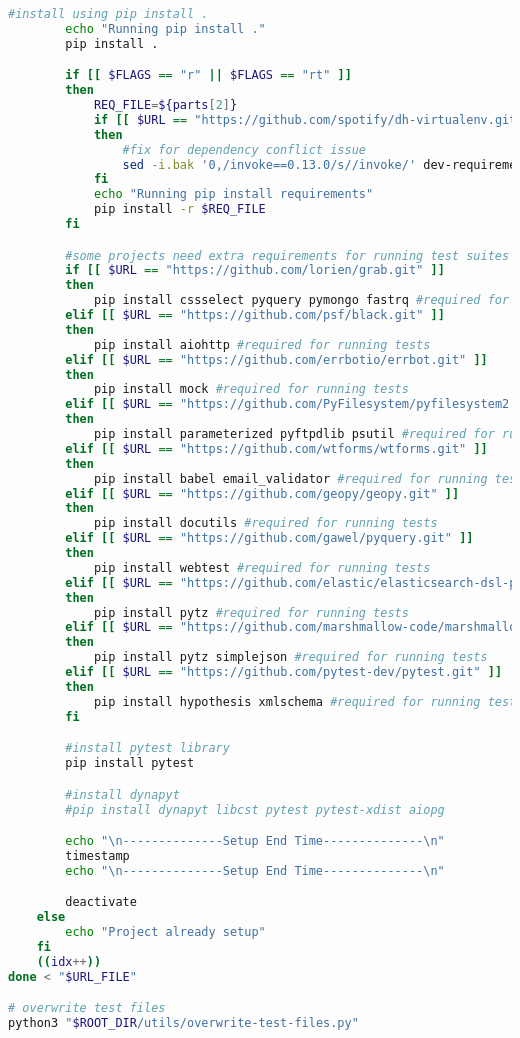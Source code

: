 \begin{lstlisting}[caption=install-missing-projects.sh,label=code:install-missing-projects.sh,language=Bash]
        #install using pip install . 
        echo "Running pip install ."
        pip install .

        if [[ $FLAGS == "r" || $FLAGS == "rt" ]]
        then
            REQ_FILE=${parts[2]}
            if [[ $URL == "https://github.com/spotify/dh-virtualenv.git" ]]
            then
                #fix for dependency conflict issue
                sed -i.bak '0,/invoke==0.13.0/s//invoke/' dev-requirements.txt
            fi
            echo "Running pip install requirements"
            pip install -r $REQ_FILE
        fi

        #some projects need extra requirements for running test suites
        if [[ $URL == "https://github.com/lorien/grab.git" ]]
        then
            pip install cssselect pyquery pymongo fastrq #required for running tests
        elif [[ $URL == "https://github.com/psf/black.git" ]]
        then
            pip install aiohttp #required for running tests
        elif [[ $URL == "https://github.com/errbotio/errbot.git" ]]
        then
            pip install mock #required for running tests
        elif [[ $URL == "https://github.com/PyFilesystem/pyfilesystem2.git" ]]
        then
            pip install parameterized pyftpdlib psutil #required for running tests
        elif [[ $URL == "https://github.com/wtforms/wtforms.git" ]]
        then
            pip install babel email_validator #required for running tests
        elif [[ $URL == "https://github.com/geopy/geopy.git" ]]
        then
            pip install docutils #required for running tests
        elif [[ $URL == "https://github.com/gawel/pyquery.git" ]]
        then
            pip install webtest #required for running tests
        elif [[ $URL == "https://github.com/elastic/elasticsearch-dsl-py.git" ]]
        then
            pip install pytz #required for running tests
        elif [[ $URL == "https://github.com/marshmallow-code/marshmallow.git" ]]
        then
            pip install pytz simplejson #required for running tests
        elif [[ $URL == "https://github.com/pytest-dev/pytest.git" ]]
        then
            pip install hypothesis xmlschema #required for running tests
        fi

        #install pytest library
        pip install pytest

        #install dynapyt
        #pip install dynapyt libcst pytest pytest-xdist aiopg

        echo "\n--------------Setup End Time--------------\n"
        timestamp
        echo "\n--------------Setup End Time--------------\n"

        deactivate
    else
        echo "Project already setup"
    fi
    ((idx++))
done < "$URL_FILE"

# overwrite test files
python3 "$ROOT_DIR/utils/overwrite-test-files.py"
\end{lstlisting}

